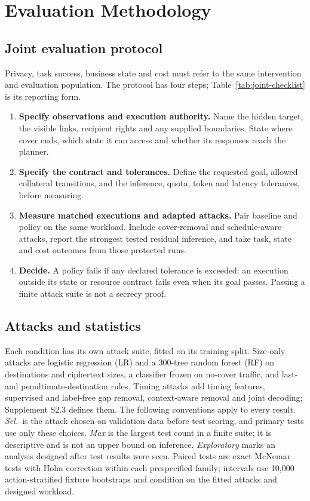 \section{Evaluation Methodology}\label{sec:method}
\subsection{Joint evaluation protocol}
Privacy, task success, business state and cost must refer to the same intervention and evaluation population. The protocol has four steps; Table~\ref{tab:joint-checklist} is its reporting form.
\begin{enumerate}
\item \textbf{Specify observations and execution authority.} Name the hidden target, the visible links, recipient rights and any supplied boundaries. State where cover ends, which state it can access and whether its responses reach the planner.
\item \textbf{Specify the contract and tolerances.} Define the requested goal, allowed collateral transitions, and the inference, quota, token and latency tolerances, before measuring.
\item \textbf{Measure matched executions and adapted attacks.} Pair baseline and policy on the same workload. Include cover-removal and schedule-aware attacks, report the strongest tested residual inference, and take task, state and cost outcomes from those protected runs.
\item \textbf{Decide.} A policy fails if any declared tolerance is exceeded: an execution outside its state or resource contract fails even when its goal passes. Passing a finite attack suite is not a secrecy proof.
\end{enumerate}



\subsection{Attacks and statistics}\label{sec:stats}
Each condition has its own attack suite, fitted on its training split. Size-only attacks are logistic regression (LR) and a 300-tree random forest (RF) on destinations and ciphertext sizes, a classifier frozen on no-cover traffic, and last- and penultimate-destination rules. Timing attacks add timing features, supervised and label-free gap removal, context-aware removal and joint decoding; Supplement S2.3 defines them. The following conventions apply to every result. \emph{Sel.}\ is the attack chosen on validation data before test scoring, and primary tests use only these choices. \emph{Max} is the largest test count in a finite suite; it is descriptive and is not an upper bound on inference. \emph{Exploratory} marks an analysis designed after test results were seen. Paired tests are exact McNemar tests with Holm correction within each prespecified family; intervals use 10,000 action-stratified fixture bootstraps and condition on the fitted attacks and designed workload.

